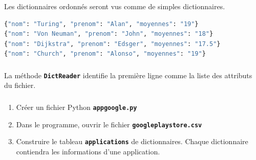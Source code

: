 \documentclass[svgnames,11pt]{beamer}
\begin{document}
\begin{frame}[fragile]
    \frametitle{}
    \begin{aretenir}[Remarque]
        Les dictionnaires ordonnés seront vus comme de simples dictionnaires.
    \end{aretenir}
    \begin{center}
        \begin{lstlisting}[language=Python, xleftmargin=0.3em,xrightmargin=-4em,basicstyle=\ttfamily\small]
{"nom": "Turing", "prenom": "Alan", "moyennes": "19"}
{"nom": "Von Neuman", "prenom": "John", "moyennes": "18"}
{"nom": "Dijkstra", "prenom": "Edsger", "moyennes": "17.5"}
{"nom": "Church", "prenom": "Alonso", "moyennes": "19"}
\end{lstlisting}
        \label{CODE}
    \end{center}

\end{frame}
\begin{frame}
    \frametitle{}

    \begin{aretenir}[Remarque]
        La méthode \textbf{\texttt{DictReader}} identifie la première ligne comme la liste des attributs du fichier.
    \end{aretenir}

\end{frame}
\begin{frame}
    \frametitle{}

    \begin{activite}
        \begin{enumerate}
            \item Créer un fichier Python \texttt{\textbf{appgoogle.py}}
            \item Dans le programme, ouvrir le fichier \texttt{\textbf{googleplaystore.csv}}
            \item Construire le tableau \textbf{\texttt{applications}} de dictionnaires. Chaque dictionnaire contiendra les informations d'une application.
        \end{enumerate}
    \end{activite}


\end{frame}
\end{document}
